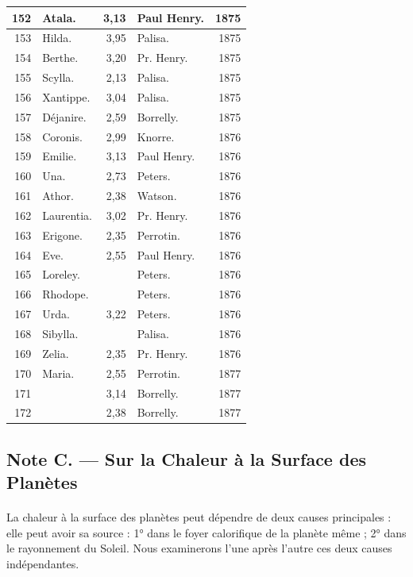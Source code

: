 \documentclass[a4paper, 11pt, oneside]{article}
\begin{document}
\begin{center}
\begin{longtable}{|r|l|r|l|r|}
        152 & Atala. & 3,13 & Paul Henry. & 1875 \\ \hline
        153 & Hilda. & 3,95 & Palisa. & 1875 \\ \hline
        154 & Berthe. & 3,20 & Pr. Henry. & 1875 \\ \hline
        155 & Scylla. & 2,13 & Palisa. & 1875 \\ \hline
        156 & Xantippe. & 3,04 & Palisa. & 1875 \\ \hline
        157 & Déjanire. & 2,59 & Borrelly. & 1875 \\ \hline
        158 & Coronis. & 2,99 & Knorre. & 1876 \\ \hline
        159 & Emilie. & 3,13 & Paul Henry. & 1876 \\ \hline
        160 & Una. & 2,73 & Peters. & 1876 \\ \hline
        161 & Athor. & 2,38 & Watson. & 1876 \\ \hline
        162 & Laurentia. & 3,02 & Pr. Henry. & 1876 \\ \hline
        163 & Erigone. & 2,35 & Perrotin. & 1876 \\ \hline
        164 & Eve. & 2,55 & Paul Henry. & 1876 \\ \hline
        165 & Loreley. & ~ & Peters. & 1876 \\ \hline
        166 & Rhodope. & ~ & Peters. & 1876 \\ \hline
        167 & Urda. & 3,22 & Peters. & 1876 \\ \hline
        168 & Sibylla. & ~ & Palisa. & 1876 \\ \hline
        169 & Zelia. & 2,35 & Pr. Henry. & 1876 \\ \hline
        170 & Maria. & 2,55 & Perrotin. & 1877 \\ \hline
        171 & ~ & 3,14 & Borrelly. & 1877 \\ \hline
        172 & ~ & 2,38 & Borrelly. & 1877 \\ \hline
    \end{longtable}
\end{center}
\clearpage
\subsection{Note C. --- Sur la Chaleur à la Surface des Planètes}
\paragraph{}
La chaleur à la surface des planètes peut dépendre de deux causes principales : elle peut avoir sa source : 1° dans le foyer calorifique de la planète même ; 2° dans le rayonnement du Soleil. Nous examinerons l'une après l'autre ces deux causes indépendantes.
\end{document}

